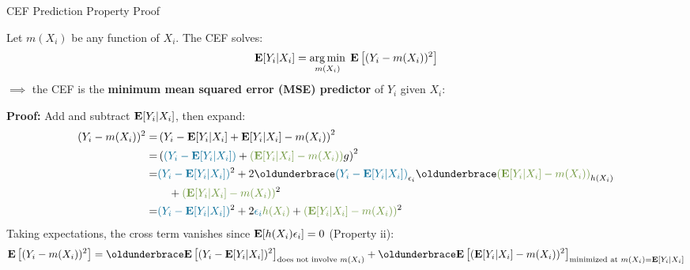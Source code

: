 \documentclass[compress, 8pt]{beamer}
\begin{document}
\begin{frame}{CEF Prediction Property Proof}

Let $m(X_i)$ be any function of $X_i$. The CEF solves:
\begin{equation*}
    \mathbf{E} [Y_i \vert X_i] = \operatorname*{arg\,min}_{m(X_i)} \; \mathbf{E} \left[ (Y_i - m(X_i))^2 \right]
\end{equation*}
$\implies$ the CEF is the \textbf{minimum mean squared error (MSE) predictor} of $Y_i$ given $X_i$:

\vspace{1ex}
\textbf{Proof:} Add and subtract $\mathbf{E} [Y_i \vert X_i]$, then expand:
\begin{align*}
    (Y_i - m(X_i))^2 
    =& \left( 
        Y_i - \EE [Y_i \vert X_i]
        + \EE [Y_i \vert X_i] - m(X_i)
        \right)^2 \\
    =& \left( 
        {\color{MainBlue}(Y_i - \EE [Y_i \vert X_i])} 
        + {\color{Green} (\EE [Y_i \vert X_i] - m(X_i))} 
       g \right)^2 \\
    =& 
        {\color{MainBlue}(Y_i - \EE [Y_i \vert X_i])}^2 
        + 2 \underbrace{{\color{MainBlue}(Y_i - \EE [Y_i \vert X_i])}}_{\epsilon_i} 
        \underbrace{{\color{Green} (\EE [Y_i \vert X_i] - m(X_i))}}_{h(X_i)}
        \\ &\quad + {\color{Green} (\EE [Y_i \vert X_i] - m(X_i))}^2 \\
    =& 
        {\color{MainBlue}(Y_i - \EE [Y_i \vert X_i])}^2 
        + 2 {\color{MainBlue}\epsilon_i} 
        {\color{Green} h(X_i)}
        + {\color{Green} (\EE [Y_i \vert X_i] - m(X_i))}^2
\end{align*}
Taking expectations, the cross term vanishes since $\mathbf{E} [h(X_i) \epsilon_i] = 0$ (Property ii):
\begin{equation*}
    \EE \left[ (Y_i - m(X_i))^2 \right] = \underbrace{\EE \left[ (Y_i - \EE [Y_i \vert X_i])^2 \right]}_{\text{does not involve } m(X_i)} + \underbrace{\EE \left[ (\EE [Y_i \vert X_i] - m(X_i))^2 \right]}_{\text{minimized at } m(X_i) = \EE [Y_i \vert X_i]}
\end{equation*}

\end{frame}
\end{document}
